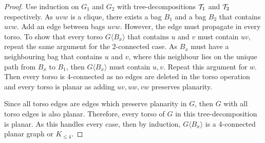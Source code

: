 \begin{proof}
	Use induction on $G_1$ and $G_2$ with tree-decompositions $\mathcal{T}_1$ and $\mathcal{T}_2$ respectively. As $uvw$ is a clique, there exists a bag $B_1$ and a bag $B_2$ that contains $uvw$. Add an edge between bags $uvw$. However, the edge must propagate in every torso. To show that every torso $G\langle B_x \rangle$ that contains $u$ and $v$ must contain $uv$, repeat the same argument for the $2$-connected case. As $B_x$ must have a neighbouring bag that contains $u$ and $v$, where this neighbour lies on the unique path from $B_x$ to $B_1$, then $G\langle B_x \rangle$ must contain $u, v$. Repeat this argument for $w$. Then every torso is $4$-connected as no edges are deleted in the torso operation and every torso is planar as adding $uv, uw, vw$ preserves planarity. 

	Since all torso edges are edges which preserve planarity in $G$, then $G$ with all torso edges is also planar. Therefore, every torso of $G$ in this tree-decomposition is planar.
	As this handles every case, then by induction, $G \langle B_x \rangle$ is a 4-connected planar graph or $K_{\leq 4}$. 
\end{proof}